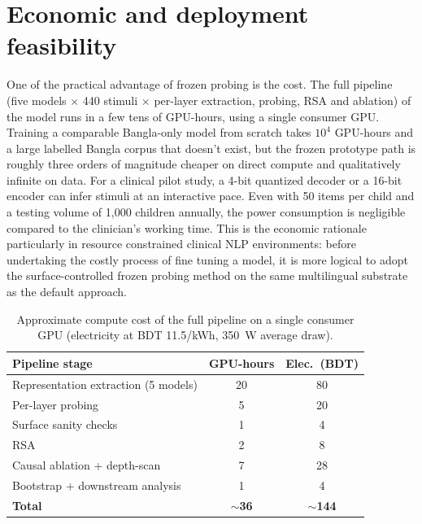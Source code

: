 \documentclass[preprint,12pt,authoryear]{elsarticle}
\begin{document}
\section{Economic and deployment feasibility}
\label{sec:cost}
One of the practical advantage of frozen probing is the cost. The full pipeline (five models $\times$ 440 stimuli $\times$ per-layer extraction, probing, RSA and ablation) of the model runs in a few tens of GPU-hours, using a single consumer GPU. Training a comparable Bangla-only model from scratch takes $10^{4}$ GPU-hours and a large labelled Bangla corpus that doesn't exist, but the frozen prototype path is roughly three orders of magnitude cheaper on direct compute and qualitatively infinite on data. For a clinical pilot study, a 4-bit quantized decoder or a 16-bit encoder can infer stimuli at an interactive pace. Even with 50 items per child and a testing volume of 1,000 children annually, the power consumption is negligible compared to the clinician's working time. This is the economic rationale particularly in resource constrained clinical NLP environments: before undertaking the costly process of fine tuning a model, it is more logical to adopt the surface-controlled frozen probing method on the same multilingual substrate as the default approach.

\begin{table}[H]
\caption{Approximate compute cost of the full pipeline on a single consumer GPU (electricity at BDT 11.5/kWh, 350~W average draw).}
\label{tab:cost}
\centering
\small
\setlength{\tabcolsep}{5pt}
\begin{tabular}{lcc}
\toprule
\textbf{Pipeline stage} & \textbf{GPU-hours} & \textbf{Elec.\ (BDT)} \\
\midrule
Representation extraction (5 models) & 20 & 80 \\
Per-layer probing & 5 & 20 \\
Surface sanity checks & 1 & 4 \\
RSA & 2 & 8 \\
Causal ablation + depth-scan & 7 & 28 \\
Bootstrap + downstream analysis & 1 & 4 \\
\midrule
\textbf{Total} & \textbf{$\sim$36} & \textbf{$\sim$144} \\
\bottomrule
\end{tabular}
\end{table}

\end{document}
